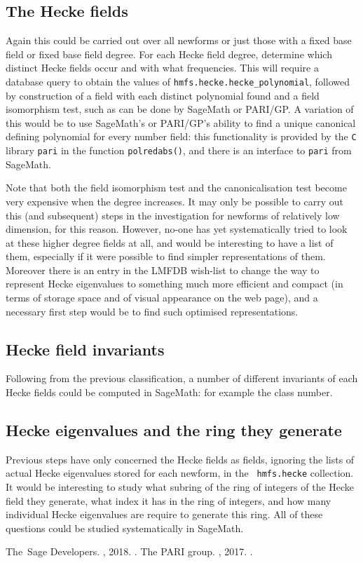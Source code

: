 \documentclass{llncs}
\begin{document}
\subsection{The Hecke fields} Again this could be carried out over all
newforms or just those with a fixed base field or fixed base field
degree.  For each Hecke field degree, determine which distinct Hecke
fields occur and with what frequencies.  This will require a database
query to obtain the values of {\tt hmfs.hecke.hecke\_polynomial},
followed by construction of a field with each distinct polynomial
found and a field isomorphism test, such as can be done by SageMath or
PARI/GP.  A variation of this would be to use SageMath's or PARI/GP's
ability to find a unique canonical defining polynomial for every
number field: this functionality is provided by the {\tt C} library
{\tt pari} in the function {\tt polredabs()}, and there is an
interface to {\tt pari} from SageMath.

Note that both the field isomorphism test and the canonicalisation
test become very expensive when the degree increases.  It may only be
possible to carry out this (and subsequent) steps in the investigation
for newforms of relatively low dimension, for this reason.  However,
no-one has yet systematically tried to look at these higher degree
fields at all, and would be interesting to have a list of them,
especially if it were possible to find simpler representations of
them.  Moreover there is an entry in the LMFDB wish-list to change the
way to represent Hecke eigenvalues to something much more efficient
and compact (in terms of storage space and of visual appearance on the
web page), and a necessary first step would be to find such optimised
representations.

\subsection{Hecke field invariants} Following from the previous
classification, a number of different invariants of each Hecke fields
could be computed in SageMath: for example the class number.

\subsection{Hecke eigenvalues and the ring they generate} Previous
steps have only concerned the Hecke fields as fields, ignoring the
lists of actual Hecke eigenvalues stored for each newform, in the {\tt
  hmfs.hecke} collection.  It would be interesting to study what
subring of the ring of integers of the Hecke field they generate, what
index it has in the ring of integers, and how many individual Hecke
eigenvalues are require to generate this ring.  All of these questions
could be studied systematically in SageMath.

\begin{thebibliography}{10}
The~Sage Developers.
, 2018.
.
  The PARI group.
, 2017.
.
\end{thebibliography}
\end{document}
